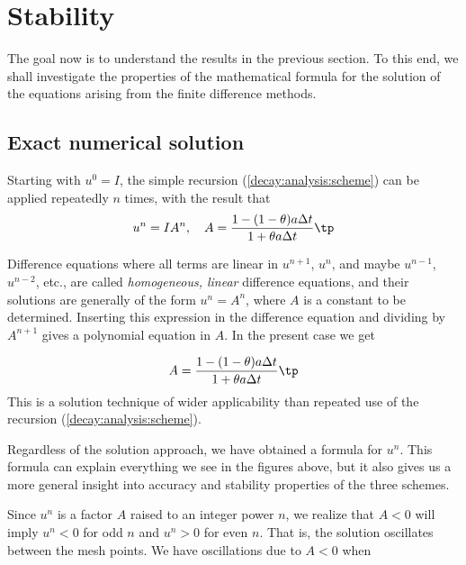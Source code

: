 \documentclass[graybox,sectrefs,envcountresetchap,open=right,final]{svmonodo}
\newenvironment{notice_mdfboxadmon}[1][]{
\begin{notice_mdfboxmdframed}[frametitle=#1]
}
{
\end{notice_mdfboxmdframed}
}
\begin{document}
\section{Stability}

The goal now is to understand the results in the previous section.
To this end, we shall investigate the properties of the mathematical
formula for the solution of the equations arising from the finite
difference methods.

\subsection{Exact numerical solution}

Starting with $u^0=I$, the simple recursion (\ref{decay:analysis:scheme})
can be applied repeatedly $n$ times, with the result that
\begin{equation}
u^{n} = IA^n,\quad A = \frac{1 - (1-\theta) a\Delta t}{1 + \theta a\Delta t}\tp
\label{decay:analysis:unex}
\end{equation}


\begin{notice_mdfboxadmon}
Difference equations where all terms are linear in
$u^{n+1}$, $u^n$, and maybe $u^{n-1}$, $u^{n-2}$, etc., are
called \emph{homogeneous, linear} difference equations, and their solutions
are generally of the form $u^n=A^n$, where $A$ is a constant to be
determined. Inserting this expression in the difference equation
and dividing by $A^{n+1}$ gives
a polynomial equation in $A$. In the present case we get

\[ A = \frac{1 - (1-\theta) a\Delta t}{1 + \theta a\Delta t}\tp \]
This is a solution technique of wider applicability than repeated use of
the recursion (\ref{decay:analysis:scheme}).
\end{notice_mdfboxadmon} %



Regardless of the solution approach, we have obtained a formula for
$u^n$.  This formula can explain everything we see in the figures
above, but it also gives us a more general insight into accuracy and
stability properties of the three schemes.


Since $u^n$ is a factor $A$
raised to an integer power $n$, we realize that $A < 0$
will imply $u^n < 0$ for odd $n$ and $u^n > 0$ for even $n$.
That is, the solution oscillates between the mesh points.
We have oscillations due to $A < 0$ when
\end{document}
